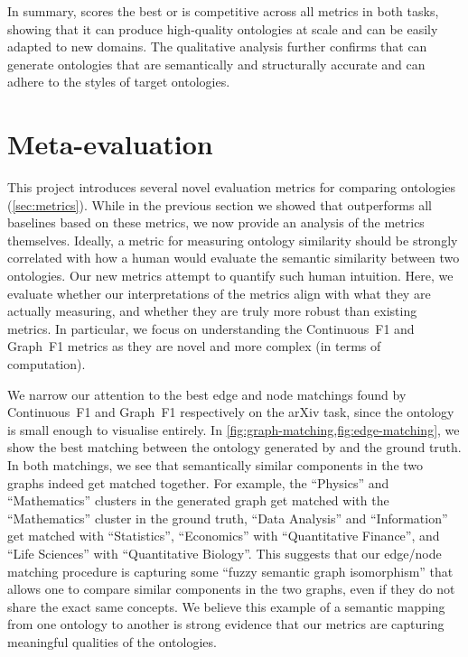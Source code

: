 In summary, \name scores the best or is competitive across all metrics in both tasks, showing that it can produce high-quality ontologies at scale and can be easily adapted to new domains. The qualitative analysis further confirms that \name can generate ontologies that are semantically and structurally accurate and can adhere to the styles of target ontologies.

\section{Meta-evaluation}

This project introduces several novel evaluation metrics for comparing ontologies (\cref{sec:metrics}). While in the previous section we showed that \name outperforms all baselines based on these metrics, we now provide an analysis of the metrics themselves. Ideally, a metric for measuring ontology similarity should be strongly correlated with how a human would evaluate the semantic similarity between two ontologies. Our new metrics attempt to quantify such human intuition. Here, we evaluate whether our interpretations of the metrics align with what they are actually measuring, and whether they are truly more robust than existing metrics. In particular, we focus on understanding the Continuous~F1 and Graph~F1 metrics as they are novel and more complex (in terms of computation).

We narrow our attention to the best edge and node matchings found by Continuous~F1 and Graph~F1 respectively on the arXiv task, since the ontology is small enough to visualise entirely. In \cref{fig:graph-matching,fig:edge-matching}, we show the best matching between the ontology generated by \name and the ground truth. In both matchings, we see that semantically similar components in the two graphs indeed get matched together. For example, the ``Physics'' and ``Mathematics'' clusters in the generated graph get matched with the ``Mathematics'' cluster in the ground truth, ``Data Analysis'' and ``Information'' get matched with ``Statistics'', ``Economics'' with ``Quantitative Finance'', and ``Life Sciences'' with ``Quantitative Biology''. This suggests that our edge/node matching procedure is capturing some ``fuzzy semantic graph isomorphism'' that allows one to compare similar components in the two graphs, even if they do not share the exact same concepts. We believe this example of a semantic mapping from one ontology to another is strong evidence that our metrics are capturing meaningful qualities of the ontologies.

